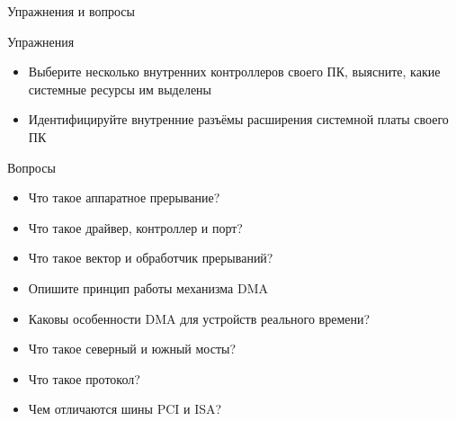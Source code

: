 \documentclass[xetex,aspectratio=43]{beamer}
\begin{document}
\begin{frame}{Упражнения и вопросы}
	\begin{block}{Упражнения}
		\begin{itemize}
			\tightlist
			\item
			Выберите несколько внутренних контроллеров своего ПК, выясните, какие
			системные ресурсы им выделены
            \item
            Идентифицируйте внутренние разъёмы расширения системной платы своего ПК
		\end{itemize}
	\end{block}

	\begin{block}{Вопросы}
		\begin{itemize}
			\tightlist
			\item
			Что такое аппаратное прерывание?
			\item
			Что такое драйвер, контроллер и порт?
			\item
			Что такое вектор и обработчик прерываний?
			\item
			Опишите принцип работы механизма DMA
			\item
			Каковы особенности DMA для устройств реального времени?
            \item
            Что такое северный и южный мосты?
            \item
            Что такое протокол?
            \item Чем отличаются шины PCI и ISA?
		\end{itemize}
	\end{block}
\end{frame}

\postamble
\end{document}
